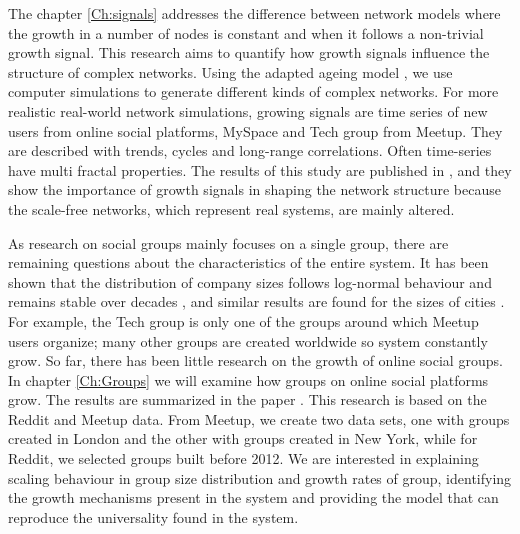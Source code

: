 The chapter \ref{Ch:signals} addresses the difference between network models where the growth in a number of nodes is constant and when it follows a non-trivial growth signal. This research aims to quantify how growth signals influence the structure of complex networks. Using the adapted ageing model \cite{hajra2004}, we use computer simulations to generate different kinds of complex networks. For more realistic real-world network simulations, growing signals are time series of new users from online social platforms, MySpace and Tech group from Meetup. They are described with trends, cycles and long-range correlations. Often time-series have multi fractal properties. The results of this study are published in \cite{vranic2021growth}, and they show the importance of growth signals in shaping the network structure because the scale-free networks, which represent real systems, are mainly altered. 

As research on social groups mainly focuses on a single group, there are remaining questions about the characteristics of the entire system. It has been shown that the distribution of company sizes follows log-normal behaviour and remains stable over decades \cite{stanley1996scaling}, and similar results are found for the sizes of cities \cite{barthelemy2016structure, barthelemy2019statistical}. For example, the Tech group is only one of the groups around which Meetup users organize; many other groups are created worldwide so system constantly grow. So far, there has been little research on the growth of online social groups. In chapter \ref{Ch:Groups} we will examine how groups on online social platforms grow. The results are summarized in the paper  \cite{vranic2022universal}. This research is based on the Reddit and Meetup data. From Meetup, we create two data sets, one with groups created in London and the other with groups created in New York, while for Reddit, we selected groups built before 2012. We are interested in explaining scaling behaviour in group size distribution and growth rates of group, identifying the growth mechanisms present in the system and providing the model that can reproduce the universality found in the system.

